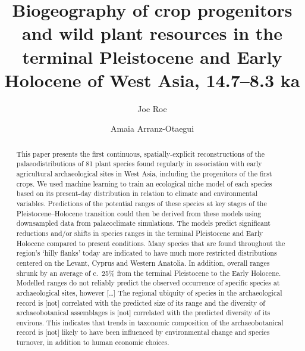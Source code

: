 \documentclass[
  authoryear,
  preprint]{elsarticle}
\begin{document}
\begin{frontmatter}
\title{Biogeography of crop progenitors and wild plant resources in the
terminal Pleistocene and Early Holocene of West Asia, 14.7--8.3 ka}
\author[1,2]{Joe Roe%
%
}
\author[3]{Amaia Arranz-Otaegui%
%
}





        
\begin{abstract}
This paper presents the first continuous, spatially-explicit
reconstructions of the palaeodistributions of 81 plant species found
regularly in association with early agricultural archaeological sites in
West Asia, including the progenitors of the first crops. We used machine
learning to train an ecological niche model of each species based on its
present-day distribution in relation to climate and environmental
variables. Predictions of the potential ranges of these species at key
stages of the Pleistocene--Holocene transition could then be derived
from these models using downsampled data from palaeoclimate simulations.
The models predict significant reductions and/or shifts in species
ranges in the terminal Pleistocene and Early Holocene compared to
present conditions. Many species that are found throughout the region's
`hilly flanks' today are indicated to have much more restricted
distributions centered on the Levant, Cyprus and Western Anatolia. In
addition, overall ranges shrunk by an average of c.~25\% from the
terminal Pleistocene to the Early Holocene. Modelled ranges do not
reliably predict the observed occurrence of specific species at
archaeological sites, however {[}\ldots{]} The regional ubiquity of
species in the archaeological record is {[}not{]} correlated with the
predicted size of its range and the diversity of archaeobotanical
assemblages is {[}not{]} correlated with the predicted diversity of its
environs. This indicates that trends in taxonomic composition of the
archaeobotanical record is {[}not{]} likely to have been influenced by
environmental change and species turnover, in addition to human economic
choices.
\end{abstract}





\end{frontmatter}
    
\end{document}
